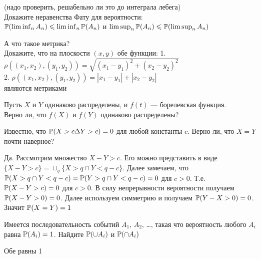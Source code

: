 \begin{solution}
\begin{solution}
\begin{solution}
\begin{solution}
\end{solution}

\begin{problem}
 (надо проверить, решабельно ли это до интеграла лебега) \\
Докажите неравенства Фату для вероятности: \\
$\P(\liminf_{n}A_{n})\le \liminf_{n}\P(A_{n})$ и
$\limsup_{n}\P(A_{n})\le \P(\limsup_{n}A_{n})$ 
\end{problem} 
\begin{solution} 

\end{solution}

\begin{problem}
 А что такое метрика? \\
Докажите, что на плоскости $(x,y)$ обе функции:
1. $\rho((x_{1},x_{2}),(y_{1},y_{2}))=\sqrt{(x_{1}-y_{1})^{2}+(x_{2}-y_{2})^{2}}$ \\
2. $\rho((x_{1},x_{2}),(y_{1},y_{2}))=|x_{1}-y_{1}|+|x_{2}-y_{2}|$ \\
являются метриками 
\end{problem} 
\begin{solution} 

\end{solution}

\begin{problem}
Пусть $X$ и $Y$ одинаково распределены, и $f(t)$ --- борелевская
функция. \\
Верно ли, что $f(X)$ и $f(Y)$ одинаково распределены? 
\end{problem} 
\begin{solution} 

\end{solution}

\begin{problem}
Известно, что $ \P(X>c \Delta Y>c)=0 $ для любой константы $ c $. Верно ли, что $X=Y$ почти наверное?
\end{problem} 
\begin{solution} 
Да. Рассмотрим множество $ X-Y>c $. Его можно представить в виде $ \{X-Y>c\}=\cup_{q} \{ X>q \cap Y<q-c\} $. Далее замечаем, что $ \P(X>q \cap Y<q-c)=\P(Y>q \cap Y<q-c)=0 $ для $ c>0 $. Т.е. $ \P(X-Y>c)=0 $ для $ c>0 $. В силу непрерывности вероятности получаем $ \P(X-Y>0)=0 $. Далее используем симметрию и получаем $ \P(Y-X>0)=0 $. Значит $ \P(X=Y)=1 $
\end{solution}

\begin{problem}
Имеется последовательность событий $A_1$, $A_2$, \ldots, такая что вероятность любого $A_i$ равна $\P(A_i)=1$. Найдите $\P(\cup A_i)$ и $\P(\cap A_i)$
\end{problem} 
\begin{solution} 
Обе равны 1
\end{solution}


\end{solution}
\end{solution}
\end{solution}
